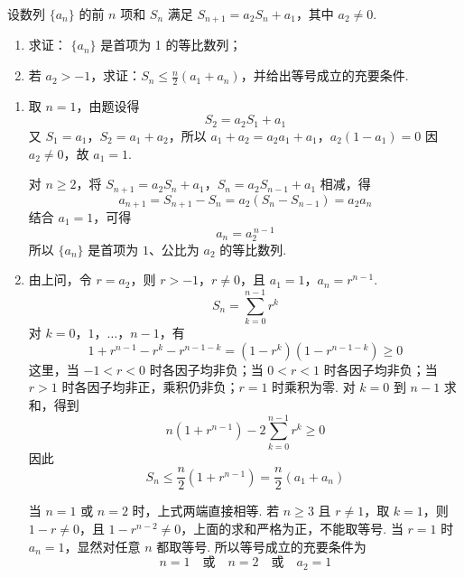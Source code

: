 \begin{problem}
设数列 \(\{a_{n}\}\) 的前 \(n\) 项和 \(S_{n}\) 满足 \(S_{n + 1} = a_2S_n + a_1\)，其中 \(a_2\neq 0\).
\begin{enumerate}
\item 求证： \(\{a_{n}\}\) 是首项为 1 的等比数列；
\item 若 \(a_{2} > -1\)，求证：\(S_{n} \leqslant \frac{n}{2}(a_{1} + a_{n})\)，并给出等号成立的充要条件.
\end{enumerate}
\begin{solution}
\begin{enumerate}
\item 取 \(n=1\)，由题设得
\[
S_{2}=a_{2}S_{1}+a_{1}
\]
又 \(S_{1}=a_{1}\)，\(S_{2}=a_{1}+a_{2}\)，所以
\(a_{1}+a_{2}=a_{2}a_{1}+a_{1}\)，\(a_{2}(1-a_{1})=0\)
因 \(a_{2}\ne0\)，故 \(a_{1}=1\).

对 \(n\ge2\)，将
\(S_{n+1}=a_{2}S_{n}+a_{1}\)，\(S_{n}=a_{2}S_{n-1}+a_{1}\)
相减，得
\[
a_{n+1}=S_{n+1}-S_{n}=a_{2}(S_{n}-S_{n-1})=a_{2}a_{n}
\]
结合 \(a_{1}=1\)，可得
\[
a_{n}=a_{2}^{\,n-1}
\]
所以 \(\{a_{n}\}\) 是首项为 \(1\)、公比为 \(a_{2}\) 的等比数列.

\item 由上问，令 \(r=a_{2}\)，则 \(r>-1\)，\(r\ne0\)，且 \(a_{1}=1\)，\(a_{n}=r^{n-1}\).
\[
S_{n}=\sum_{k=0}^{n-1}r^{k}
\]
对 \(k=0\)，\(1\)，\(\ldots\)，\(n-1\)，有
\[
1+r^{n-1}-r^{k}-r^{n-1-k}
=\left(1-r^{k}\right)\left(1-r^{n-1-k}\right)\ge0
\]
这里，当 \(-1<r<0\) 时各因子均非负；当 \(0<r<1\) 时各因子均非负；当 \(r>1\) 时各因子均非正，乘积仍非负；\(r=1\) 时乘积为零. 对 \(k=0\) 到 \(n-1\) 求和，得到
\[
n\left(1+r^{n-1}\right)-2\sum_{k=0}^{n-1}r^{k}\ge0
\]
因此
\[
S_{n}\le\frac n2\left(1+r^{n-1}\right)
=\frac n2(a_{1}+a_{n})
\]

当 \(n=1\) 或 \(n=2\) 时，上式两端直接相等. 若 \(n\ge3\) 且 \(r\ne1\)，取 \(k=1\)，则 \(1-r\ne0\)，且 \(1-r^{n-2}\ne0\)，上面的求和严格为正，不能取等号. 当 \(r=1\) 时 \(a_{n}=1\)，显然对任意 \(n\) 都取等号. 所以等号成立的充要条件为
\[
n=1\quad\text{或}\quad n=2\quad\text{或}\quad a_{2}=1
\]
\end{enumerate}
\end{solution}
\end{problem}
